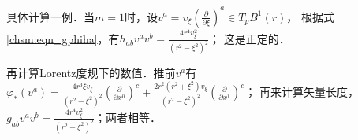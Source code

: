
\begin{example}
    具体计算一例．当$m=1$时，设$v^a=v_{\xi}(\frac{\partial}{\partial \xi})^a\in T_pB^1(r)$，
    根据式\eqref{chsm:eqn_gphiha}，有$h_{ab}v^a v^b= \frac{4r^4 v^2_\xi}{(r^2-\xi^2)^2}$；
    这是正定的．
    
    再计算Lorentz度规下的数值．推前$v^a$有$\varphi_*(v^a)= \frac{4r^3\xi v_\xi}{(r^2-\xi^2)^2}
    (\frac{\partial}{\partial x^0})^c+ \frac{2r^2(r^2+\xi^2) v_\xi}{(r^2-\xi^2)^2}(\frac{\partial}{\partial x^1})^c$；
    再来计算矢量长度，$g_{ab}v^a v^b= \frac{4r^4 v^2_\xi}{(r^2-\xi^2)^2}$；两者相等．
\end{example}



